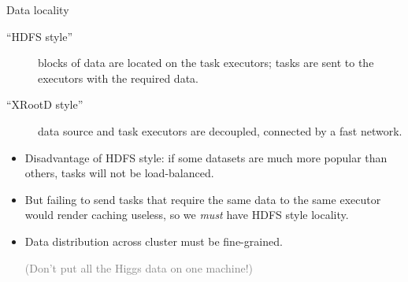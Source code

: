 \documentclass{beamer}
\begin{document}
\begin{frame}{Data locality}
\begin{description}
\item[``HDFS style''] blocks of data are located on the task executors; tasks are sent to the executors with the required data.
\item[``XRootD style''] data source and task executors are decoupled, connected by a fast network.
\end{description}

\begin{itemize}
\item<2-> Disadvantage of HDFS style: if some datasets are much more popular than others, tasks will not be load-balanced.
\item<3-> But failing to send tasks that require the same data to the same executor would render caching useless, so we {\it must} have HDFS style locality.
\item<4-> Data distribution across cluster must be fine-grained.

\textcolor{gray}{(Don't put all the Higgs data on one machine!)}
\end{itemize}
\end{frame}
\end{document}
